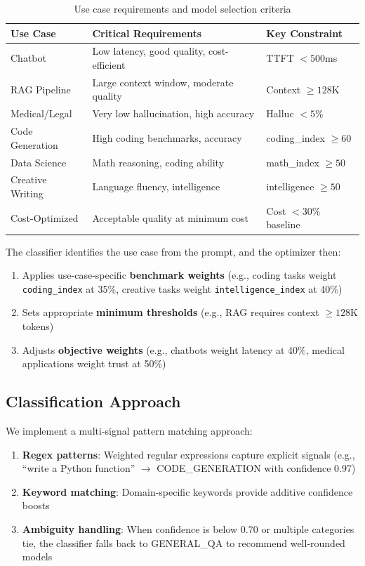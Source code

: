 \documentclass[11pt,a4paper]{article}
\begin{document}
\begin{table}[h]
\centering
\caption{Use case requirements and model selection criteria}
\label{tab:use_case_requirements}
\begin{tabular}{@{}lp{4.5cm}l@{}}
\toprule
\textbf{Use Case} & \textbf{Critical Requirements} & \textbf{Key Constraint} \\
\midrule
Chatbot & Low latency, good quality, cost-efficient & TTFT $< 500$ms \\
RAG Pipeline & Large context window, moderate quality & Context $\geq 128$K \\
Medical/Legal & Very low hallucination, high accuracy & Halluc $< 5\%$ \\
Code Generation & High coding benchmarks, accuracy & coding\_index $\geq 60$ \\
Data Science & Math reasoning, coding ability & math\_index $\geq 50$ \\
Creative Writing & Language fluency, intelligence & intelligence $\geq 50$ \\
Cost-Optimized & Acceptable quality at minimum cost & Cost $< 30\%$ baseline \\
\bottomrule
\end{tabular}
\end{table}

The classifier identifies the use case from the prompt, and the optimizer then:
\begin{enumerate}
    \item Applies use-case-specific \textbf{benchmark weights} (e.g., coding tasks weight \texttt{coding\_index} at 35\%, creative tasks weight \texttt{intelligence\_index} at 40\%)
    \item Sets appropriate \textbf{minimum thresholds} (e.g., RAG requires context $\geq 128$K tokens)
    \item Adjusts \textbf{objective weights} (e.g., chatbots weight latency at 40\%, medical applications weight trust at 50\%)
\end{enumerate}

\subsection{Classification Approach}

We implement a multi-signal pattern matching approach:

\begin{enumerate}
    \item \textbf{Regex patterns}: Weighted regular expressions capture explicit signals (e.g., ``write a Python function'' $\rightarrow$ CODE\_GENERATION with confidence 0.97)
    
    \item \textbf{Keyword matching}: Domain-specific keywords provide additive confidence boosts
    
    \item \textbf{Ambiguity handling}: When confidence is below 0.70 or multiple categories tie, the classifier falls back to GENERAL\_QA to recommend well-rounded models
\end{enumerate}
\end{document}
